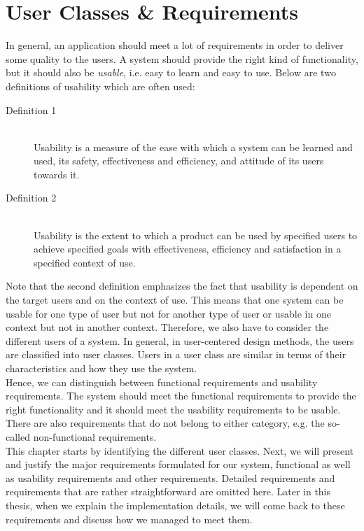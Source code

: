 \chapter{User Classes \& Requirements}\label{ch:requirements}

In general, an application should meet a lot of requirements in order to deliver some quality to the users. A system should provide the right kind of functionality, but it should also be \textit{usable}, i.e. easy to learn and easy to use. Below are two definitions of usability which are often used:
\begin{description}
	\item[Definition 1] \hfill \\
	Usability is a measure of the ease with which a system can be learned and used, its safety, effectiveness and efficiency, and attitude of its users towards it. \hfill \citep{usability-definition-preece}

	\item[Definition 2] \hfill \\
	Usability is the extent to which a product can be used by specified users to achieve specified goals with effectiveness, efficiency and satisfaction in a specified context of use. \hfill \citep{usability-definition-improved}
\end{description}

Note that the second definition emphasizes the fact that usability is dependent on the target users and on the context of use. This means that one system can be usable for one type of user but not for another type of user or usable in one context but not in another context. Therefore, we also have to consider the different users of a system. In general, in user-centered design methods, the users are classified into user classes. Users in a user class are similar in terms of their characteristics and how they use the system.\\

Hence, we can distinguish between functional requirements and usability requirements. The system should meet the functional requirements to provide the right functionality and it should meet the usability requirements to be usable. There are also requirements that do not belong to either category, e.g. the so-called non-functional requirements.\\

This chapter starts by identifying the different user classes. Next, we will present and justify the major requirements formulated for our system, functional as well as usability requirements and other requirements. Detailed requirements and requirements that are rather straightforward are omitted here. Later in this thesis, when we explain the implementation details, we will come back to these requirements and discuss how we managed to meet them.



